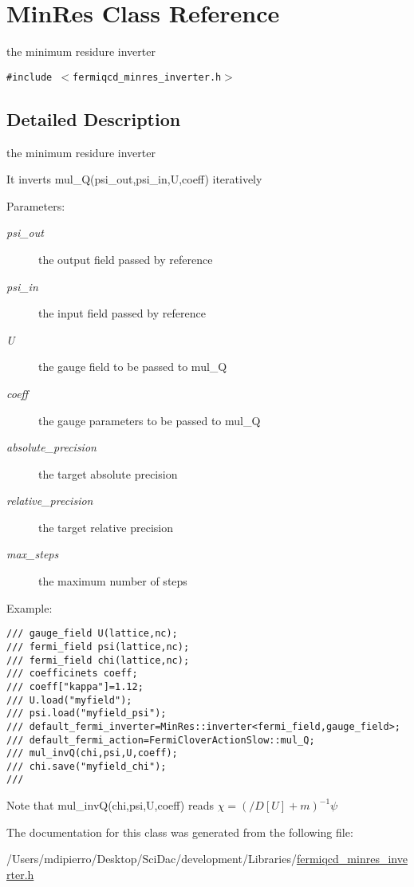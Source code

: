 \hypertarget{class_min_res}{
\section{MinRes Class Reference}
\label{class_min_res}
}
the minimum residure inverter  


{\tt \#include $<$fermiqcd\_\-minres\_\-inverter.h$>$}



\subsection{Detailed Description}
the minimum residure inverter 

It inverts mul\_\-Q(psi\_\-out,psi\_\-in,U,coeff) iteratively \begin{Desc}
\item[Parameters:]
\begin{description}
\item[{\em psi\_\-out}]the output field passed by reference \item[{\em psi\_\-in}]the input field passed by reference \item[{\em U}]the gauge field to be passed to mul\_\-Q \item[{\em coeff}]the gauge parameters to be passed to mul\_\-Q \item[{\em absolute\_\-precision}]the target absolute precision \item[{\em relative\_\-precision}]the target relative precision \item[{\em max\_\-steps}]the maximum number of steps\end{description}
\end{Desc}
Example: 

\footnotesize\begin{verbatim}
/// gauge_field U(lattice,nc);
/// fermi_field psi(lattice,nc);
/// fermi_field chi(lattice,nc);
/// coefficinets coeff;
/// coeff["kappa"]=1.12;
/// U.load("myfield");
/// psi.load("myfield_psi");
/// default_fermi_inverter=MinRes::inverter<fermi_field,gauge_field>;
/// default_fermi_action=FermiCloverActionSlow::mul_Q;
/// mul_invQ(chi,psi,U,coeff);
/// chi.save("myfield_chi");
/// \end{verbatim}
\normalsize
 Note that mul\_\-invQ(chi,psi,U,coeff) reads $ \chi=(/\!\!\!D[U]+m)^{-1}\psi $ 

The documentation for this class was generated from the following file:\begin{CompactItemize}
\item 
/Users/mdipierro/Desktop/SciDac/development/Libraries/\hyperlink{fermiqcd__minres__inverter_8h}{fermiqcd\_\-minres\_\-inverter.h}\end{CompactItemize}
